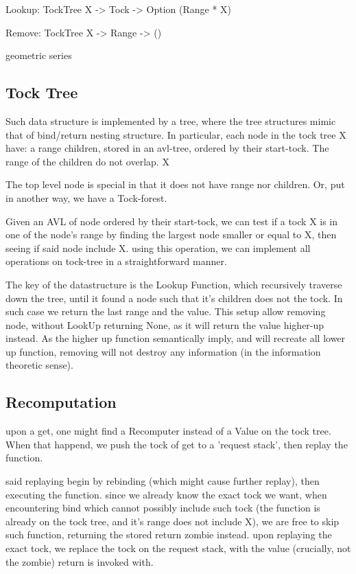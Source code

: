 Lookup: TockTree X -> Tock -> Option (Range * X)

Remove: TockTree X -> Range -> ()

geometric series
\subsection{Tock Tree}
Such data structure is implemented by a tree, where the tree structures mimic that of bind/return nesting structure. In particular, each node in the tock tree X have:
a range
children, stored in an avl-tree, ordered by their start-tock. The range of the children do not overlap.
X

The top level node is special in that it does not have range nor children. Or, put in another way, we have a Tock-forest.

Given an AVL of node ordered by their start-tock, we can test if a tock X is in one of the node's range by finding the largest node smaller or equal to X, then seeing if said node include X. using this operation, we can implement all operations on tock-tree in a straightforward manner.

The key of the datastructure is the Lookup Function, which recursively traverse down the tree, until it found a node such that it's children does not the tock. In such case we return the last range and the value. This setup allow removing node, without LookUp returning None, as it will return the value higher-up instead. As the higher up function semantically imply, and will recreate all lower up function, removing will not destroy any information (in the information theoretic sense).
\subsection{Recomputation}
upon a get, one might find a Recomputer instead of a Value on the tock tree. When that happend, we push the tock of get to a 'request stack', then replay the function.

said replaying begin by rebinding (which might cause further replay), then executing the function. since we already know the exact tock we want, when encountering bind which cannot possibly include such tock (the function is already on the tock tree, and it's range does not include X), we are free to skip such function, returning the stored return zombie instead. upon replaying the exact tock, we replace the tock on the request stack, with the value (crucially, not the zombie) return is invoked with.

